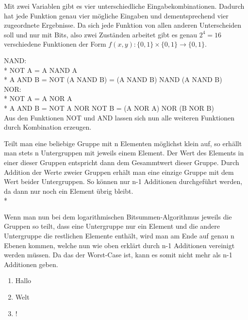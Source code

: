 \documentclass[a4paper,11pt]{article}             %
\begin{document}

Mit zwei Variablen gibt es vier unterschiedliche Eingabekombinationen.
Dadurch hat jede Funktion genau vier mögliche Eingaben und dementsprechend vier zugeordnete Ergebnisse.
Da sich jede Funktion von allen anderen Unterscheiden soll und nur mit Bits, also zwei Zuständen arbeitet gibt es genau $2^4 = 16$ verschiedene Funktionen der Form $f (x, y) : \{0,1\} \times \{0, 1\} \rightarrow \{0, 1\}$.


NAND:\\*
NOT A = A NAND A\\*
A AND B = NOT (A NAND B) = (A NAND B) NAND (A NAND B)\\

NOR:\\*
NOT A = A NOR A\\*
A AND B = NOT A NOR NOT B = (A NOR A) NOR (B NOR B)\\

Aus den Funktionen NOT und AND lassen sich nun alle weiteren Funktionen durch Kombination erzeugen.


Teilt man eine beliebige Gruppe mit n Elementen möglichst klein auf, so erhällt man stets n Untergruppen mit jeweils einem Element.
Der Wert des Elements in einer dieser Gruppen entspricht dann dem Gesammtwert dieser Gruppe. 
Durch Addition der Werte zweier Gruppen erhält man eine einzige Gruppe mit dem Wert beider Untergruppen.
So können nur n-1 Additionen durchgeführt werden, da dann nur noch ein Element übrig bleibt.\\*

Wenn man nun bei dem logarithmischen Bitsummen-Algorithmus jeweils die Gruppen so teilt, dass eine Untergruppe nur ein Element
und die andere Untergruppe die restlichen Elemente enthält, wird man am Ende auf genau n Ebenen kommen,
welche nun wie oben erklärt durch n-1 Additionen vereinigt werden müssen. Da das der Worst-Case ist, kann es somit nicht mehr als n-1 Additionen geben.


\begin{enumerate}

\item Hallo

\item Welt
\item !

\end{enumerate}
\end{document}
